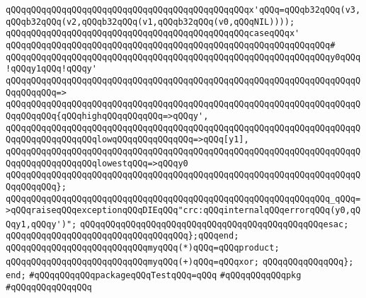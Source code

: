 \newline
\verb|qQQqqQQqqQQqqQQqqQQqqQQqqQQqqQQqqQQqqQQqqQQqqQQqx'qQQq=qQQqb32qQQq(v3,qQQqb32qQQq(v2,qQQqb32qQQq(v1,qQQqb32qQQq(v0,qQQqNIL))));|\newline
\newline
\verb|qQQqqQQqqQQqqQQqqQQqqQQqqQQqqQQqqQQqqQQqqQQqqQQqcaseqQQqx'|\newline
\verb|qQQqqQQqqQQqqQQqqQQqqQQqqQQqqQQqqQQqqQQqqQQqqQQqqQQqqQQqqQQqqQQq#|\newline
\verb|qQQqqQQqqQQqqQQqqQQqqQQqqQQqqQQqqQQqqQQqqQQqqQQqqQQqqQQqqQQqqQQqy0qQQq!qQQqy1qQQq!qQQqy'|\newline
\verb|qQQqqQQqqQQqqQQqqQQqqQQqqQQqqQQqqQQqqQQqqQQqqQQqqQQqqQQqqQQqqQQqqQQqqQQqqQQqqQQq=>|\newline
\verb|qQQqqQQqqQQqqQQqqQQqqQQqqQQqqQQqqQQqqQQqqQQqqQQqqQQqqQQqqQQqqQQqqQQqqQQqqQQqqQQq{qQQqhighqQQqqQQqqQQq=>qQQqy',|\newline
\verb|qQQqqQQqqQQqqQQqqQQqqQQqqQQqqQQqqQQqqQQqqQQqqQQqqQQqqQQqqQQqqQQqqQQqqQQqqQQqqQQqqQQqqQQqlowqQQqqQQqqQQqqQQq=>qQQq[y1],|\newline
\verb|qQQqqQQqqQQqqQQqqQQqqQQqqQQqqQQqqQQqqQQqqQQqqQQqqQQqqQQqqQQqqQQqqQQqqQQqqQQqqQQqqQQqqQQqlowestqQQq=>qQQqy0|\newline
\verb|qQQqqQQqqQQqqQQqqQQqqQQqqQQqqQQqqQQqqQQqqQQqqQQqqQQqqQQqqQQqqQQqqQQqqQQqqQQqqQQq};|\newline
\newline
\verb|qQQqqQQqqQQqqQQqqQQqqQQqqQQqqQQqqQQqqQQqqQQqqQQqqQQqqQQqqQQqqQQq_qQQq=>qQQqraiseqQQqexceptionqQQqDIEqQQq"crc:qQQqinternalqQQqerrorqQQq(y0,qQQqy1,qQQqy')";|\newline
\verb|qQQqqQQqqQQqqQQqqQQqqQQqqQQqqQQqqQQqqQQqqQQqqQQqesac;|\newline
\newline
\verb|qQQqqQQqqQQqqQQqqQQqqQQqqQQqqQQqqQQq};qQQqend;|\newline
\newline
\verb|qQQqqQQqqQQqqQQqqQQqqQQqqQQqmyqQQq(*)qQQq=qQQqproduct;|\newline
\verb|qQQqqQQqqQQqqQQqqQQqqQQqqQQqmyqQQq(+)qQQq=qQQqxor;|\newline
\verb|qQQqqQQqqQQqqQQq};|\newline
\verb|end;|\newline
\newline
\verb|#qQQqqQQqqQQqpackageqQQqTestqQQq=qQQq|\newline
\verb|#qQQqqQQqqQQqpkg|\newline
\verb|#qQQqqQQqqQQqqQQq|\newline
